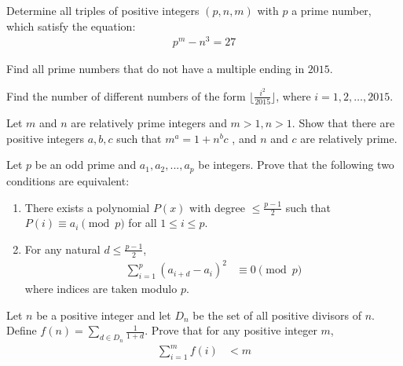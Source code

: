 \documentclass[problems.tex]{subfile}
\begin{document}
	\begin{problem}[Chile 2016]
		Determine all triples of positive integers $(p, n, m)$ with $p$ a prime number, which satisfy the equation:
		\begin{align*}
			p^m - n^3 = 27
		\end{align*}
	\end{problem}

	\begin{problem}
		Find all prime numbers that do not have a multiple ending in $2015$.
	\end{problem}

	\begin{problem}[Chile 2016]
		Find the number of different numbers of the form $\lfloor\frac{i^2}{2015}\rfloor$, where $i=1,2,\dots,2015$.
	\end{problem}

	\begin{problem}
		Let $m$ and $n$ are relatively prime integers and $m>1,n>1$. Show that there are positive integers $a,b,c$ such that $m^a=1+n^bc$ , and $n$ and $c$ are relatively prime. %
	\end{problem}

	\begin{problem}
		Let $p$ be an odd prime and $a_1, a_2,...,a_p$ be integers. Prove that the following two conditions are equivalent:
		\begin{enumerate}
			\item There exists a polynomial $P(x)$ with degree $\leq \frac{p-1}{2}$ such that $P(i) \equiv a_i \pmod p$ for all $1 \leq i \leq p$.
			\item For any natural $d \leq \frac{p-1}{2}$,
				\begin{align*}
					\sum_{i=1}^p (a_{i+d} - a_i )^2
						& \equiv 0 \pmod p
				\end{align*}
			where indices are taken modulo $p$.
		\end{enumerate}
	\end{problem}

	\begin{problem}
		Let $n$ be a positive integer and let $D_n$ be the set of all positive divisors of $n$. Define $f(n)=\sum\limits_{d\in D_n}{\frac{1}{1+d}}$.
		Prove that for any positive integer $m$,
			\begin{align*}
				\sum_{i=1}^{m}{f(i)}
					& <m
			\end{align*}
	\end{problem}
\end{document}
